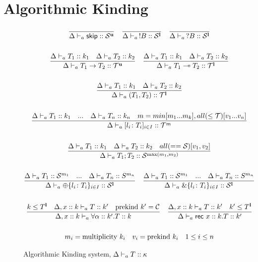 \documentclass[12pt,openright,twoside]{report}
\begin{document}
\section{Algorithmic Kinding} 
\begin{figure}[ht]
\centering
  \begin{gather*}
	\frac{}{\Delta \vdash_{a} \mathsf{skip} :: \mathcal S^{\mathbf{u}}} \quad
	\frac{}{\Delta \vdash_{a} \,!B :: \mathcal S^{\mathbf{l}}} \quad \frac{}{\Delta
			\vdash_{a} \,?B :: \mathcal S^{\mathbf{l}}}
    \\\\
    \frac{\Delta \vdash_{a} T_1 :: k_1 \quad \Delta \vdash_{a} T_2 :: k_2}
    	{\Delta \vdash_{a} T_1 \to T_2 :: \mathcal T^{\mathbf{u}}} \quad
    \frac{\Delta \vdash_{a} T_1 :: k_1 \quad \Delta \vdash_{a} T_2 :: k_2}
    	{\Delta \vdash_{a} T_1 \multimap T_2 :: \mathcal T^{\mathbf{l}}}	
    \\
    \\
    \frac{\Delta \vdash_{a} T_1 :: k_1 \quad \Delta \vdash_{a} T_2 :: k_2}
    	{\Delta \vdash_{a} (T_1,T_2) :: \mathcal T^{\mathbf{l}}}	
    \\
    \\	
    \frac{\Delta \vdash_{a} T_1 :: k_1 \quad...\quad \Delta \vdash_{a} T_n :: k_n \quad 
    		m=min[m_1 ... m_k], all(\le \mathcal T)[v_1 ... v_n]}
    	{\Delta \vdash_{a} [l_i\colon T_i]_{i\in I} :: \mathcal T^m}	
	\\
	\\
	\frac{\Delta \vdash_{a} T_1 :: k_1 \quad \Delta \vdash_{a} T_2 :: k_2 \quad all(== \mathcal S)[v_1,v_2]}
    	{\Delta \vdash_{a} T_1;T_2 :: \mathcal S^{\max(m_1, m_2)}}	    
	\\	
	\\
		\frac{\Delta \vdash_{a} T_1 :: \mathcal S^{m_1} \quad \mbox{...} \quad \Delta \vdash_{a} T_n :: S^{m_n}}{
      \Delta \vdash_{a} \oplus\{l_i\colon T_i\}_{i\in I} :: \mathcal S^{\mathbf{l}}}
    \quad
    \frac{\Delta \vdash_{a} T_1 :: \mathcal S^{m_1} \quad \mbox{...} \quad \Delta \vdash_{a} T_n :: S^{m_n}}
    { \Delta \vdash_{a} \&\{l_i\colon T_i\}_{i\in I} :: \mathcal S^{\mathbf{l}}}
	\\		
	\\
	 \frac{k \le T^{\mathbf{l}} \quad \Delta, x :: k \vdash_{a} T :: k' \quad \mbox{prekind } k' = \mathcal C}
    { \Delta, x :: k \vdash_{a} \forall \alpha :: k'.T :: k}
	\quad
	\frac{\Delta, x :: k \vdash_{a} T :: k' \quad k' \le T^{\mathbf{l}}}
	    { \Delta \vdash_{a} \mathsf{rec} \mbox{ } x :: k.T :: k'}
	\\
	    \\	
	m_i = \mbox{multiplicity } k_i \quad v_i = \mbox{prekind } k_i \quad 1 \le i \le n 
	\end{gather*}
  \caption{Algorithmic Kinding system, $\Delta \vdash_{a} T :: \kappa$}
  \label{fig:kinding}
\end{figure}
%



\end{document}
